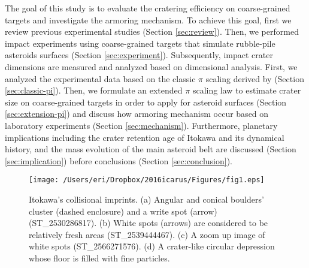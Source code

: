\documentclass[3p,authoryear]{elsarticle}
\begin{document}
The goal of this study is to evaluate the cratering efficiency on coarse-grained targets and investigate the armoring mechanism.
To achieve this goal, first we review previous experimental studies (Section \ref{sec:review}). Then, we performed impact experiments using coarse-grained targets that simulate rubble-pile asteroids surfaces (Section \ref{sec:experiment}).
Subsequently, impact crater dimensions are measured and analyzed based on dimensional analysis.
First, we analyzed the experimental data based on the classic $\pi$ scaling derived by \citet{holsapple1993} (Section \ref{sec:classic-pi}).
Then, we formulate an extended $\pi$ scaling law to estimate crater size on coarse-grained targets in order to apply for asteroid surfaces (Section \ref{sec:extension-pi}) and discuss how armoring mechanism occur based on laboratory experiments (Section \ref{sec:mechanism}).
Furthermore, planetary implications including the crater retention age of Itokawa and its dynamical history, and the mass evolution of the main asteroid belt are discussed (Section \ref{sec:implication}) before conclusions (Section \ref{sec:conclusion}).

\begin{figure*}[tbp]
	\begin{center}
	\texttt{[image: /Users/eri/Dropbox/2016icarus/Figures/fig1.eps]}
	\caption{Itokawa's collisional imprints. (a) Angular and conical boulders' cluster (dashed enclosure) and a write spot (arrow) (ST{\_}2530286817). (b) White spots (arrows) are considered to be relatively fresh areas (ST{\_}2539444467). (c) A zoom up image of white spots (ST{\_}2566271576). (d) A crater-like circular depression whose floor is filled with fine particles. \citep{nakamura2008,hirata2009}}
	\label{amica}
	\end{center}
\end{figure*}

\end{document}
